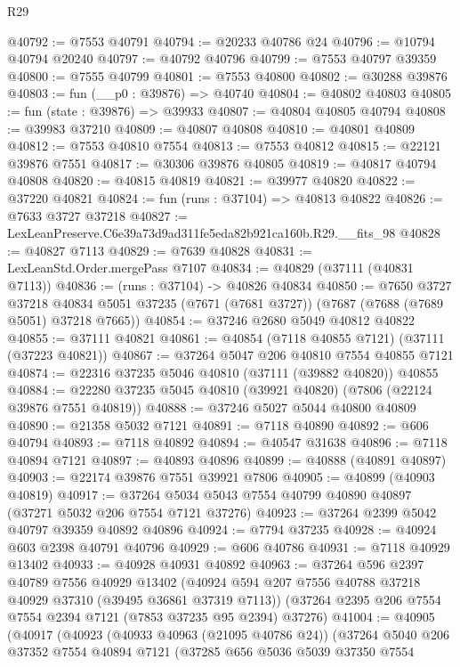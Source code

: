 \begin{lexlean}{R29}
\begin{coremodule}
@40792 := @7553 @40791
@40794 := @20233 @40786 @24
@40796 := @10794 @40794 @20240
@40797 := @40792 @40796
@40799 := @7553 @40797 @39359
@40800 := @7555 @40799
@40801 := @7553 @40800
@40802 := @30288 @39876
@40803 := fun (__p0 : @39876) => @40740
@40804 := @40802 @40803
@40805 := fun (state : @39876) => @39933
@40807 := @40804 @40805 @40794
@40808 := @39983 @37210
@40809 := @40807 @40808
@40810 := @40801 @40809
@40812 := @7553 @40810 @7554
@40813 := @7553 @40812
@40815 := @22121 @39876 @7551
@40817 := @30306 @39876 @40805
@40819 := @40817 @40794 @40808
@40820 := @40815 @40819
@40821 := @39977 @40820
@40822 := @37220 @40821
@40824 := fun (runs : @37104) => @40813 @40822
@40826 := @7633 @3727 @37218
@40827 := LexLeanPreserve.C6e39a73d9ad311fe5eda82b921ca160b.R29.__fits_98
@40828 := @40827 @7113
@40829 := @7639 @40828
@40831 := LexLeanStd.Order.mergePass @7107
@40834 := @40829 (@37111 (@40831 @7113))
@40836 := (runs : @37104) -> @40826 @40834
@40850 := @7650
    @3727
    @37218
    @40834
    @5051
    @37235
    (@7671 (@7681 @3727))
    (@7687 (@7688 (@7689 @5051) @37218 @7665))
@40854 := @37246 @2680 @5049 @40812 @40822
@40855 := @37111 @40821
@40861 := @40854 (@7118 @40855 @7121) (@37111 (@37223 @40821))
@40867 := @37264 @5047 @206 @40810 @7554 @40855 @7121
@40874 := @22316 @37235 @5046 @40810 (@37111 (@39882 @40820)) @40855
@40884 := @22280 @37235 @5045 @40810 (@39921 @40820) (@7806 (@22124 @39876 @7551 @40819))
@40888 := @37246 @5027 @5044 @40800 @40809
@40890 := @21358 @5032 @7121
@40891 := @7118 @40890
@40892 := @606 @40794
@40893 := @7118 @40892
@40894 := @40547 @31638
@40896 := @7118 @40894 @7121
@40897 := @40893 @40896
@40899 := @40888 (@40891 @40897)
@40903 := @22174 @39876 @7551 @39921 @7806
@40905 := @40899 (@40903 @40819)
@40917 := @37264 @5034 @5043 @7554 @40799 @40890 @40897 (@37271 @5032 @206 @7554 @7121 @37276)
@40923 := @37264 @2399 @5042 @40797 @39359 @40892 @40896
@40924 := @7794 @37235
@40928 := @40924 @603 @2398 @40791 @40796
@40929 := @606 @40786
@40931 := @7118 @40929 @13402
@40933 := @40928 @40931 @40892
@40963 := @37264
    @596
    @2397
    @40789
    @7556
    @40929
    @13402
    (@40924 @594 @207 @7556 @40788 @37218 @40929 @37310 (@39495 @36861 @37319 @7113))
    (@37264 @2395 @206 @7554 @7554 @2394 @7121 (@7853 @37235 @95 @2394) @37276)
@41004 := @40905
    (@40917
      (@40923
        (@40933 @40963 (@21095 @40786 @24))
        (@37264
          @5040
          @206
          @37352
          @7554
          @40894
          @7121
          (@37285
            @656
            @5036
            @5039
            @37350
            @7554

\end{coremodule}
\end{lexlean}

